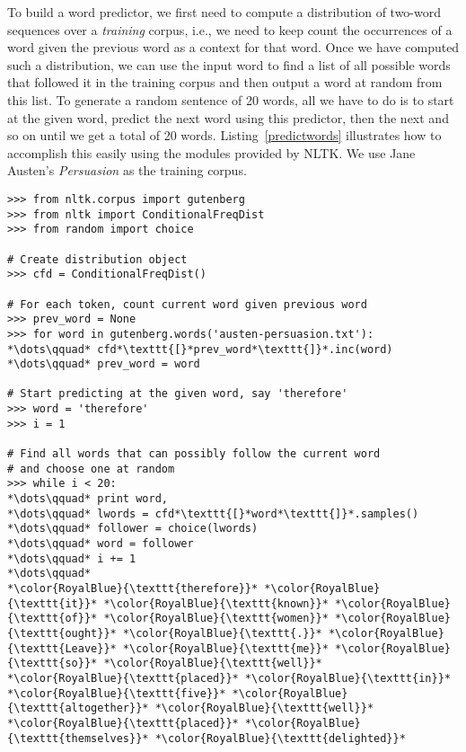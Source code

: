 \documentclass[11pt]{article}
\begin{document}
\noindent To build a word predictor, we first need to compute a distribution of two-word sequences over a \emph{training} corpus, i.e., we need to keep count the occurrences of a word given the previous word as a context for that word. Once we have computed such a distribution, we can use the input word to find a list of all possible words that followed it in the training corpus and then output a word at random from this list. To generate a random sentence of 20 words, all we have to do is to start at the given word, predict the next word using this predictor, then the next and so on until we get a total of 20 words. Listing~\ref{predictwords} illustrates how to accomplish this easily using the modules provided by NLTK. We use Jane Austen's \emph{Persuasion} as the training corpus. \\

\begin{lstlisting}[float,caption=Predicting words using NLTK.,label=predictwords,frame=trBL,escapechar=*]
>>> from nltk.corpus import gutenberg
>>> from nltk import ConditionalFreqDist
>>> from random import choice

# Create distribution object
>>> cfd = ConditionalFreqDist()

# For each token, count current word given previous word
>>> prev_word = None
>>> for word in gutenberg.words('austen-persuasion.txt'):
*\dots\qquad* cfd*\texttt{[}*prev_word*\texttt{]}*.inc(word)
*\dots\qquad* prev_word = word

# Start predicting at the given word, say 'therefore'
>>> word = 'therefore'
>>> i = 1

# Find all words that can possibly follow the current word
# and choose one at random
>>> while i < 20:
*\dots\qquad* print word,
*\dots\qquad* lwords = cfd*\texttt{[}*word*\texttt{]}*.samples()
*\dots\qquad* follower = choice(lwords)
*\dots\qquad* word = follower
*\dots\qquad* i += 1
*\dots\qquad*
*\color{RoyalBlue}{\texttt{therefore}}* *\color{RoyalBlue}{\texttt{it}}* *\color{RoyalBlue}{\texttt{known}}* *\color{RoyalBlue}{\texttt{of}}* *\color{RoyalBlue}{\texttt{women}}* *\color{RoyalBlue}{\texttt{ought}}* *\color{RoyalBlue}{\texttt{.}}* *\color{RoyalBlue}{\texttt{Leave}}* *\color{RoyalBlue}{\texttt{me}}* *\color{RoyalBlue}{\texttt{so}}* *\color{RoyalBlue}{\texttt{well}}*
*\color{RoyalBlue}{\texttt{placed}}* *\color{RoyalBlue}{\texttt{in}}* *\color{RoyalBlue}{\texttt{five}}* *\color{RoyalBlue}{\texttt{altogether}}* *\color{RoyalBlue}{\texttt{well}}* *\color{RoyalBlue}{\texttt{placed}}* *\color{RoyalBlue}{\texttt{themselves}}* *\color{RoyalBlue}{\texttt{delighted}}*
\end{lstlisting}
\end{document}

